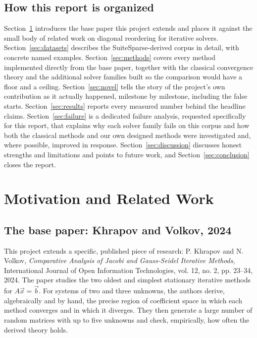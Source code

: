 \documentclass[11pt,a4paper]{article}
\begin{document}
\subsection{How this report is organized}
\label{sec:intro-organization}

Section~\ref{sec:motivation} introduces the base paper this project extends and places it
against the small body of related work on diagonal reordering for iterative solvers.
Section~\ref{sec:datasets} describes the SuiteSparse-derived corpus in detail, with
concrete named examples. Section~\ref{sec:methods} covers every method implemented
directly from the base paper, together with the classical convergence theory and the
additional solver families built so the comparison would have a floor and a ceiling.
Section~\ref{sec:novel} tells the story of the project's own contribution as it actually
happened, milestone by milestone, including the false starts. Section~\ref{sec:results}
reports every measured number behind the headline claims. Section~\ref{sec:failure} is a
dedicated failure analysis, requested specifically for this report, that explains why each
solver family fails on this corpus and how both the classical methods and our own designed
methods were investigated and, where possible, improved in response. Section~\ref{sec:discussion}
discusses honest strengths and limitations and points to future work, and
Section~\ref{sec:conclusion} closes the report.

\clearpage
\section{Motivation and Related Work}
\label{sec:motivation}

\subsection{The base paper: Khrapov and Volkov, 2024}
\label{sec:motivation-paper}

This project extends a specific, published piece of research: P. Khrapov and N. Volkov,
\emph{Comparative Analysis of Jacobi and Gauss-Seidel Iterative Methods}, International
Journal of Open Information Technologies, vol. 12, no. 2, pp. 23--34, 2024. The paper
studies the two oldest and simplest stationary iterative methods for $A\vec{x}=\vec{b}$.
For systems of two and three unknowns, the authors derive, algebraically and by hand, the
precise region of coefficient space in which each method converges and in which it
diverges. They then generate a large number of random matrices with up to five unknowns
and check, empirically, how often the derived theory holds.
\end{document}
